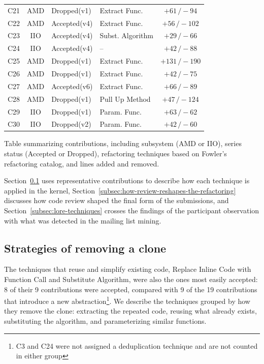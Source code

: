 \documentclass[10pt,conference]{IEEEtran}
\begin{document}
\begin{table}[ht]
\begin{threeparttable}
\begin{tabularx}{\columnwidth}{ c c l X c }
C21 & AMD & Dropped\hfill(v1) & Extract Func. & $+61\,/\!-\!94$ \\
C22 & AMD & Accepted\hfill(v4) & Extract Func. & $+56\,/\!-\!102$ \\
C23 & IIO & Accepted\hfill(v4) & Subst. Algorithm & $+29\,/\!-\!66$ \\
C24 & IIO & Accepted\hfill(v4) & -- & $+42\,/\!-\!88$ \\
C25 & AMD & Dropped\hfill(v1) & Extract Func. & $+131\,/\!-\!190$ \\
C26 & AMD & Dropped\hfill(v1) & Extract Func. & $+42\,/\!-\!75$ \\
C27 & AMD & Accepted\hfill(v6) & Extract Func. & $+66\,/\!-\!89$ \\
C28 & AMD & Dropped\hfill(v1) & Pull Up Method & $+47\,/\!-\!124$ \\
C29 & IIO & Dropped\hfill(v1) & Param. Func. & $+63\,/\!-\!62$ \\
C30 & IIO & Dropped\hfill(v2) & Param. Func. & $+42\,/\!-\!60$ \\
\bottomrule
\end{tabularx}
\begin{tablenotes}[flushleft]
\footnotesize
\item[a] Table summarizing contributions, including subsystem (AMD or IIO), series status (Accepted or Dropped), refactoring techniques based on Fowler's refactoring catalog, and lines added and removed.
\end{tablenotes}
\end{threeparttable}
\end{table}

Section~\ref{subsec:reusing-and-simplifying} uses representative contributions to describe how each technique is applied in the kernel, Section~\ref{subsec:how-review-reshapes-the-refactoring} discusses how code review shaped the final form of the submissions, and Section~\ref{subsec:lore-techniques} crosses the findings of the participant observation with what was detected in the mailing list mining.

\subsection{Strategies of removing a clone}\label{subsec:reusing-and-simplifying}

The techniques that reuse and simplify existing code, Replace Inline Code with Function Call and Substitute Algorithm, were also the ones most easily accepted: 8 of their 9 contributions were accepted, compared with 9 of the 19 contributions that introduce a new abstraction\footnote{C3 and C24 were not assigned a deduplication technique and are not counted in either group}. We describe the techniques grouped by how they remove the clone: extracting the repeated code, reusing what already exists, substituting the algorithm, and parameterizing similar functions.
\end{document}
